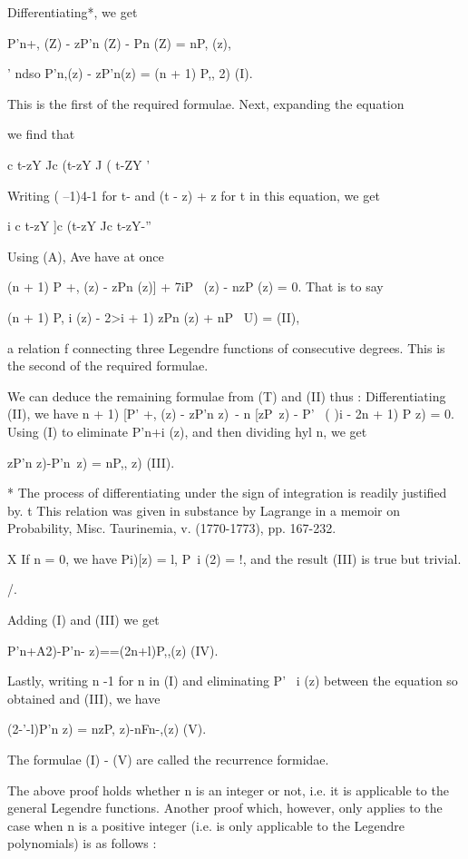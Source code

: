 {Differentiating*, we get

P'n+, (Z) - zP'n (Z) - Pn (Z) = nP, (z),

' ndso P'n,(z) - zP'n(z) = (n + 1) P,, 2) (I).

This is the first of the required formulae. Next, expanding the
equation

we find that

c t-zY Jc (t-zY J ( t-ZY '

Writing ( --1)4-1 for t- and (t - z) + z for t in this equation, we
get

 i c t-zY ]c (t-zY Jc t-zY-''

Using (A), Ave have at once

(n + 1) P +, (z) - zPn (z)] + 7iP \, (z) - nzP (z) = 0. That is to
say

(n + 1) P, i (z) - 2>i + 1) zPn (z) + nP \, U) = (II),

a relation f connecting three Legendre functions of consecutive
degrees. This is the second of the required formulae.

We can deduce the remaining formulae from (T) and (II) thus :
Differentiating (II), we have n + 1) [P' +, (z) - zP'n z)\ - n [zP\ z)
- P' \, ( )i - 2n + 1) P z) = 0. Using (I) to eliminate P'n+i (z),
and then dividing hyl n, we get

zP'n z)-P'n\, z) = nP,, z) (III).

* The process of differentiating under the sign of integration is
readily justified by. t This relation was given in substance by
Lagrange in a memoir on Probability, Misc. Taurinemia, v. (1770-1773),
pp. 167-232.

X If n = 0, we have Pi)[z) = l, P\ i (2) = !, and the result (III) is
true but trivial.

/.

%
%

Adding (I) and (III) we get

P'n+A2)-P'n- z)==(2n+l)P,,(z) (IV).

Lastly, writing n -1 for n in (I) and eliminating P' \ i (z) between
the equation so obtained and (III), we have

(2-'-l)P'n z) = nzP, z)-nFn-,(z) (V).

The formulae (I) - (V) are called the recurrence formidae.

The above proof holds whether n is an integer or not, i.e. it is
applicable to the general Legendre functions. Another proof which,
however, only applies to the case when n is a positive integer (i.e.
is only applicable to the Legendre polynomials) is as follows :

}
